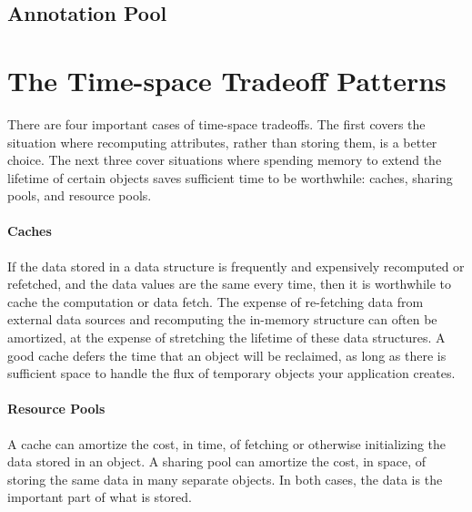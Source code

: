 \subsection{Annotation Pool}

\section{The Time-space Tradeoff Patterns}
There are four important cases of time-space tradeoffs. The first covers
the situation where recomputing attributes, rather than storing them, is a better
choice. The next three cover situations where spending memory to extend the
lifetime of certain objects saves sufficient time to be worthwhile: caches,
sharing pools, and resource pools.

\paragraph{Caches}

If the data stored in a data structure is frequently and expensively recomputed
or refetched, and the data values are the same every time, then it is worthwhile
to cache the computation or data fetch. The expense of re-fetching data from
external data sources and recomputing the in-memory structure can often be
amortized, at the expense of stretching the lifetime of these data structures. A
good cache defers the time that an object will be reclaimed, as long as there is
sufficient space to handle the flux of temporary objects your application
creates.





\paragraph{Resource Pools}
\label{sec:resource-pools}

A cache can amortize the cost, in time, of fetching or otherwise initializing the
data stored in an object. A sharing pool can amortize the cost, in space, of
storing the same data in many separate objects. In both cases, the data is the
important part of what is stored.

